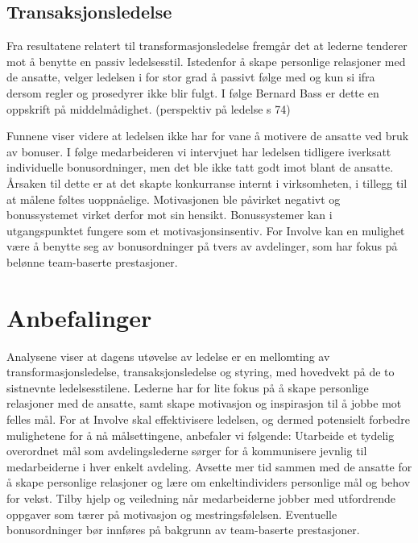 \subsection{Transaksjonsledelse}
Fra resultatene relatert til transformasjonsledelse fremgår det at lederne tenderer mot å benytte en passiv ledelsesstil. Istedenfor å skape personlige relasjoner med de ansatte, velger ledelsen i for stor grad å passivt følge med og kun si ifra dersom regler og prosedyrer ikke blir fulgt. I følge Bernard Bass er dette en oppskrift på middelmådighet. (perspektiv på ledelse s 74)

\indent \newline
Funnene viser videre at ledelsen ikke har for vane å motivere de ansatte ved bruk av bonuser. I følge medarbeideren vi intervjuet har ledelsen tidligere iverksatt individuelle bonusordninger, men det ble ikke tatt godt imot blant de ansatte. Årsaken til dette er at det skapte konkurranse internt i virksomheten, i tillegg til at målene føltes uoppnåelige. Motivasjonen ble påvirket negativt og bonussystemet virket derfor mot sin hensikt. Bonussystemer kan i utgangspunktet fungere som et motivasjonsinsentiv. For Involve kan en mulighet være å benytte seg av bonusordninger på tvers av avdelinger, som har fokus på belønne team-baserte prestasjoner.

\section{Anbefalinger}
Analysene viser at dagens utøvelse av ledelse er en mellomting av transformasjonsledelse, transaksjonsledelse og styring, med hovedvekt på de to sistnevnte ledelsesstilene. Lederne har for lite fokus på å skape personlige relasjoner med de ansatte, samt skape motivasjon og inspirasjon til å jobbe mot felles mål. For at Involve skal effektivisere ledelsen, og dermed potensielt forbedre mulighetene for å nå målsettingene, anbefaler vi følgende:
Utarbeide et tydelig overordnet mål som avdelingslederne sørger for å kommunisere jevnlig til medarbeiderne i hver enkelt avdeling.
Avsette mer tid sammen med de ansatte for å skape personlige relasjoner og lære om enkeltindividers personlige mål og behov for vekst.
Tilby hjelp og veiledning når medarbeiderne jobber med utfordrende oppgaver som tærer på motivasjon og mestringsfølelsen.
Eventuelle bonusordninger bør innføres på bakgrunn av team-baserte prestasjoner.

